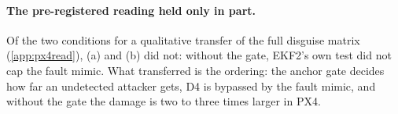 \paragraph{The pre-registered reading held only in part.}
Of the two conditions for a qualitative transfer of the full disguise matrix
(\cref{app:px4read}), (a) \nPxReadAHolds{} and (b) did not: without the gate,
EKF2's own test did not cap the fault mimic. What transferred is the ordering: the
anchor gate decides how far an undetected attacker gets, D4 is bypassed by the
fault mimic, and without the gate the damage is two to three times larger in PX4.
